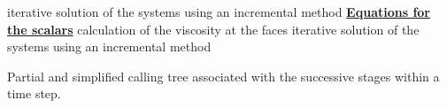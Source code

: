 \begin{table}[htp]
\hspace*{1,5cm} \hspace*{1cm}iterative solution of the systems
using an incremental method\newline
\underline{\textbf{Equations for the scalars}}\newline
\hspace*{1cm}\newline
\hspace*{1,5cm} \hspace*{1cm}calculation of the viscosity at
the faces\newline
\hspace*{1,5cm} \hspace*{1cm}iterative solution of the systems
using an incremental method\newline
\caption{Partial and simplified calling tree associated with the successive
stages within a time step.}
\label{Base_Introd_simple_calling_tree}
\end{table}
